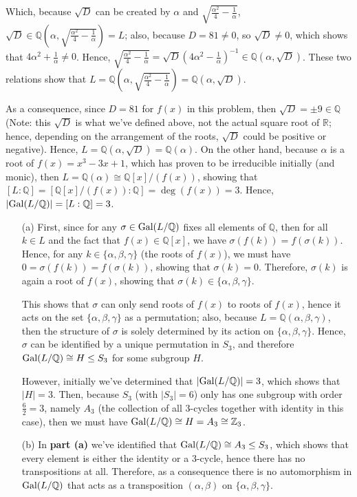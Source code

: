 \documentclass{article}
\newcommand{\ZZ}{\mathbb{Z}}
\newcommand{\QQ}{\mathbb{Q}}
\newcommand{\RR}{\mathbb{R}}
\newcommand{\Gal}{\textmd{Gal}}
\begin{document}
Which, because $\sqrt{D}$ can be created by $\alpha$ and $\sqrt{\frac{\alpha^2}{4}-\frac{1}{\alpha}}$, $\sqrt{D}\in \QQ\left(\alpha,\sqrt{\frac{\alpha^2}{4}-\frac{1}{\alpha}}\right)=L$; also, because $D=81\neq 0$, so $\sqrt{D}\neq 0$, which shows that $4\alpha^2+\frac{1}{\alpha}\neq 0$. Hence, $\sqrt{\frac{\alpha^2}{4}-\frac{1}{\alpha}}=\sqrt{D}\left(4\alpha^2-\frac{1}{\alpha}\right)^{-1}\in\QQ(\alpha,\sqrt{D})$. These two relations show that $L=\QQ\left(\alpha,\sqrt{\frac{\alpha^2}{4}-\frac{1}{\alpha}}\right)=\QQ(\alpha,\sqrt{D})$.

As a consequence, since $D=81$ for $f(x)$ in this problem, then $\sqrt{D}=\pm 9\in \QQ$ (Note: this $\sqrt{D}$ is what we've defined above, not the actual square root of $\RR$; hence, depending on the arrangement of the roots, $\sqrt{D}$ could be positive or negative). Hence, $L=\QQ(\alpha,\sqrt{D})=\QQ(\alpha)$. On the other hand, because $\alpha$ is a root of $f(x)=x^3-3x+1$, which has proven to be irreducible initially (and monic), then $L=\QQ(\alpha)\cong \QQ[x]/(f(x))$, showing that $[L:\QQ]=[\QQ[x]/(f(x)):\QQ] = \deg(f(x)) = 3$. Hence, $|\Gal(L/\QQ)| = [L:\QQ]=3$.
\begin{itemize}
    \item[(a)] First, since for any $\sigma\in \Gal(L/\QQ)$ fixes all elements of $\QQ$, then for all $k\in L$ and the fact that $f(x)\in \QQ[x]$, we have $\sigma(f(k))=f(\sigma(k))$. Hence, for any $k\in\{\alpha,\beta,\gamma\}$ (the roots of $f(x)$), we must have $0=\sigma(f(k))= f(\sigma(k))$, showing that $\sigma(k)=0$. Therefore, $\sigma(k)$ is again a root of $f(x)$, showing that $\sigma(k)\in\{\alpha,\beta,\gamma\}$.
    
    This shows that $\sigma$ can only send roots of $f(x)$ to roots of $f(x)$, hence it acts on the set $\{\alpha,\beta,\gamma\}$ as a permutation; also, because $L=\QQ(\alpha,\beta,\gamma)$, then the structure of $\sigma$ is solely determined by its action on $\{\alpha,\beta,\gamma\}$. Hence, $\sigma$ can be identified by a unique permutation in $S_3$, and therefore $\Gal(L/\QQ)\cong H\leq S_3$ for some subgroup $H$.
    
    However, initially we've determined that $|\Gal(L/\QQ)| = 3$, which shows that $|H|=3$. Then, because $S_3$ (with $|S_3|=6$) only has one subgroup with order $\frac{6}{2}=3$, namely $A_3$ (the collection of all $3$-cycles together with identity in this case), then we must have $\Gal(L/\QQ)\cong H=A_3\cong \ZZ_3$.
    \item[(b)] In \textbf{part (a)} we've identified that $\Gal(L/\QQ)\cong A_3\leq S_3$, which shows that every element is either the identity or a $3$-cycle, hence there has no transpositions at all. Therefore, as a consequence there is no automorphism in $\Gal(L/\QQ)$ that acts as a transposition $(\alpha,\beta)$ on $\{\alpha,\beta,\gamma\}$.
\end{itemize}
\end{document}
